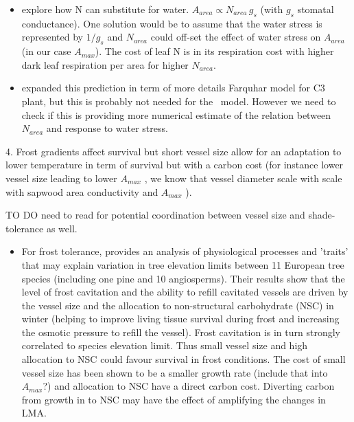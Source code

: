 \documentclass[a4paper,11pt]{article}
\begin{document}
\begin{itemize}
\item \citet{Wright-2003} explore how N can substitute for water. $A_{area} \propto N_{area} \, g_s$ (with $g_s$ stomatal conductance). One solution would be to assume that the water stress is represented by $1/g_s$ and $N_{area}$ could off-set the effect of water stress on $A_{area}$ (in our case $A_{max}$). The cost of leaf N is in its respiration cost with higher dark leaf respiration per area for higher $N_{area}$.

\item \citet{Prentice-2014} expanded this prediction in term of more details Farquhar model for C3 plant, but this is probably not needed for the \plant\ model. However we need to check if this is providing more numerical estimate of the relation between $N_{area}$ and response to water stress.
\end{itemize}

4. Frost gradients affect survival but
short vessel size allow for an adaptation to lower temperature in term
of survival but
with a carbon cost (for instance lower vessel size leading to lower
$A_{max}$ \citep{Poorter-2010}, we know that vessel diameter scale with scale with sapwood area conductivity and $A_{max}$ \citep{Chen-2009,Choat-2011}).

TO DO need to read \citet{Markesteijn-2011} for potential coordination between vessel size and shade-tolerance as well.

\begin{itemize}
\item  For frost tolerance, \citet{Charrier-2013} provides an analysis of physiological processes and 'traits' that may explain variation in tree elevation limits between 11 European tree species (including one pine and 10 angiosperms). Their results show that the level of frost cavitation and the ability to refill cavitated vessels are driven by the vessel size and the allocation to non-structural carbohydrate (NSC) in winter (helping to improve living tissue survival during frost and increasing the osmotic pressure to refill the vessel). Frost cavitation is in turn strongly correlated to species elevation limit. Thus small vessel size and high allocation to NSC could favour survival in frost conditions. The cost of small vessel size has been shown to be a smaller growth rate \citep{Poorter-2010} (include that into $A_{max}$?) and allocation to NSC have a direct carbon cost. Diverting carbon from growth in to NSC may have the effect of amplifying the changes in LMA.
\end{itemize}
\end{document}
